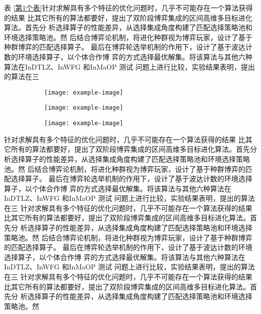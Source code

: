 表 \ref{第1个表}针对求解具有多个特征的优化问题时，几乎不可能存在一个算法获得的结果
比其它所有的算法都要好，提出了双阶段博弈集成的区间高维多目标进化算法。首先分
析选择算子的性能差异，从选择集成角度构建了匹配选择策略池和环境选择策略池。然
后结合博弈论机制，将进化种群视为博弈玩家，设计了基于种群博弈的匹配选择算子。
最后在博弈轮选举机制的作用下，设计了基于波达计数的环境选择算子，以个体合作博
弈的方式选择最优解集。将该算法与其他六种算法在InDTLZ、InWFG 和InMaOP 测试
问题上进行比较，实验结果表明，提出的算法在三
\begin{figure}[htp]
	\begin{subfigure}[b]{0.3\textwidth}
		\centering
		\texttt{[image: example-image]}
		\label{第1个子图标签名}
	\end{subfigure}
	\hfill
	\begin{subfigure}[b]{0.3\textwidth}
		\centering
		\texttt{[image: example-image]}
		\label{第2个子图标签名}
	\end{subfigure}
	\hfill
	\begin{subfigure}[b]{0.3\textwidth}
		\centering
		\texttt{[image: example-image]}
	\end{subfigure}
	\label{第1个图}
\end{figure}
针对求解具有多个特征的优化问题时，几乎不可能存在一个算法获得的结果
比其它所有的算法都要好，提出了双阶段博弈集成的区间高维多目标进化算法。首先分
析选择算子的性能差异，从选择集成角度构建了匹配选择策略池和环境选择策略池。然
后结合博弈论机制，将进化种群视为博弈玩家，设计了基于种群博弈的匹配选择算子。
最后在博弈轮选举机制的作用下，设计了基于波达计数的环境选择算子，以个体合作博
弈的方式选择最优解集。将该算法与其他六种算法在InDTLZ、InWFG 和InMaOP 测试
问题上进行比较，实验结果表明，提出的算法在三
针对求解具有多个特征的优化问题时，几乎不可能存在一个算法获得的结果
比其它所有的算法都要好，提出了双阶段博弈集成的区间高维多目标进化算法。首先分
析选择算子的性能差异，从选择集成角度构建了匹配选择策略池和环境选择策略池。然
后结合博弈论机制，将进化种群视为博弈玩家，设计了基于种群博弈的匹配选择算子。
最后在博弈轮选举机制的作用下，设计了基于波达计数的环境选择算子，以个体合作博
弈的方式选择最优解集。将该算法与其他六种算法在InDTLZ、InWFG 和InMaOP 测试
问题上进行比较，实验结果表明，提出的算法在三
针对求解具有多个特征的优化问题时，几乎不可能存在一个算法获得的结果
比其它所有的算法都要好，提出了双阶段博弈集成的区间高维多目标进化算法。首先分
析选择算子的性能差异，从选择集成角度构建了匹配选择策略池和环境选择策略池。然
